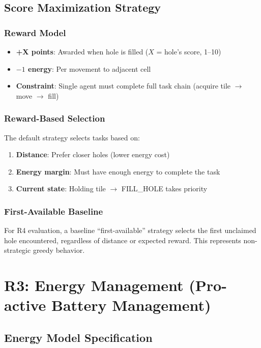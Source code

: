 \documentclass[titlepage=formal,code=listings,logo=../../assets/火炬+英文校名-左右.pdf]{../../SUSTechHomework}
\begin{document}
\subsection{Score Maximization Strategy}

\subsubsection{Reward Model}

\begin{itemize}
  \item \textbf{+X points}: Awarded when hole is filled ($X$ = hole's score, 1--10)
  \item \textbf{$-1$ energy}: Per movement to adjacent cell
  \item \textbf{Constraint}: Single agent must complete full task chain (acquire tile $\to$ move $\to$ fill)
\end{itemize}

\subsubsection{Reward-Based Selection}

The default strategy selects tasks based on:

\begin{enumerate}
  \item \textbf{Distance}: Prefer closer holes (lower energy cost)
  \item \textbf{Energy margin}: Must have enough energy to complete the task
  \item \textbf{Current state}: Holding tile $\to$ FILL\_HOLE takes priority
\end{enumerate}

\subsubsection{First-Available Baseline}

For R4 evaluation, a baseline ``first-available'' strategy selects the first unclaimed hole encountered, regardless of distance or expected reward. This represents non-strategic greedy behavior.

\section{R3: Energy Management (Pro-active Battery Management)}

\subsection{Energy Model Specification}
\end{document}

